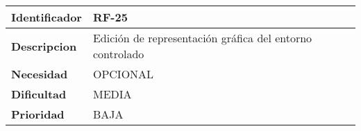 \begin{center}
    \begin{tabular}{|p{2.6cm}|p{12cm}|}
    \hline
    \textbf{Identificador} & RF-25\\
    \hline
    \textbf{Descripcion} & Edición de representación gráfica del entorno controlado\\
    \hline
    \textbf{Necesidad} & OPCIONAL\\
    \hline
    \textbf{Dificultad} & MEDIA\\
    \hline
    \textbf{Prioridad} & BAJA\\
    \hline
    \end{tabular}
\end{center}

